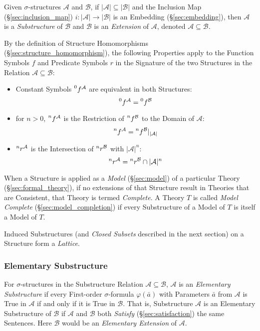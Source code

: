 Given $\sigma$-structures $\mathcal{A}$ and $\mathcal{B}$, if
$|\mathcal{A}| \subseteq |\mathcal{B}|$ and the Inclusion Map
(\S\ref{sec:inclusion_map}) $i : |\mathcal{A}| \rightarrow
|\mathcal{B}|$ is an Embedding (\S\ref{sec:embedding}), then
$\mathcal{A}$ is a \emph{Substructure} of $\mathcal{B}$ and
$\mathcal{B}$ is an \emph{Extension} of $\mathcal{A}$, denoted
$\mathcal{A} \subseteq \mathcal{B}$.

By the definition of Structure Homomorphisms
(\S\ref{sec:structure_homomorphism}), the following Properties apply
to the Function Symbols $f$ and Predicate Symbols $r$ in the Signature
of the two Structures in the Relation $\mathcal{A} \subseteq
\mathcal{B}$:
\begin{itemize}
  \item Constant Symbols $\prescript{0}{}{f}^\mathcal{A}$ are
    equivalent in both Structures:
    \[
      \prescript{0}{}{f}^\mathcal{A} = \prescript{0}{}{f}^\mathcal{B}
    \]
  \item for $n >0$, $\prescript{n}{}{f}^\mathcal{A}$ is the
    Restriction of $\prescript{n}{}{f}^\mathcal{B}$ to the Domain of
    $\mathcal{A}$:
    \[
      \prescript{n}{}{f}^\mathcal{A}
      = \prescript{n}{}{f}^\mathcal{B} |_{|\mathcal{A}|}
    \]
  \item $\prescript{n}{}{r}^\mathcal{A}$ is the Intersection of
    $\prescript{n}{}{r}^\mathcal{B}$ with $|\mathcal{A}|^n$:
    \[
      \prescript{n}{}{r}^\mathcal{A}
      = \prescript{n}{}{r}^\mathcal{B} \cap |\mathcal{A}|^n
    \]
\end{itemize}



When a Structure is applied as a \emph{Model} (\S\ref{sec:model}) of a
particular Theory (\S\ref{sec:formal_theory}), if no extensions of
that Structure result in Theories that are Consistent, that Theory is
termed \emph{Complete}. A Theory $T$ is called \emph{Model Complete}
(\S\ref{sec:model_completion}) if every Substructure of a Model of $T$
is itself a Model of $T$.

Induced Substructures (and \emph{Closed Subsets} described in the next
section) on a Structure form a \emph{Lattice}.



\subsubsection{Elementary Substructure}
\label{sec:elementary_substructure}

For $\sigma$-structures in the Substructure Relation $\mathcal{A}
\subseteq \mathcal{B}$, $\mathcal{A}$ is an \emph{Elementary
  Substructure} if every First-order $\sigma$-formula
$\varphi(\bar{a})$ with Parameters $\bar{a}$ from $\mathcal{A}$ is
True in $\mathcal{A}$ if and only if it is True in $\mathcal{B}$. That
is, Substructure $\mathcal{A}$ is an Elementary Substructure of
$\mathcal{B}$ if $\mathcal{A}$ and $\mathcal{B}$ both \emph{Satisfy}
(\S\ref{sec:satisfaction}) the same Sentences. Here $\mathcal{B}$
would be an \emph{Elementary Extension} of $\mathcal{A}$.

